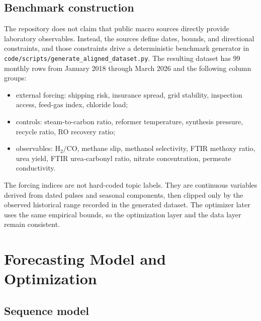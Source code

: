 \documentclass[11pt]{article}
\begin{document}
\subsection{Benchmark construction}

The repository does not claim that public macro sources directly provide laboratory observables. Instead, the sources define dates, bounds, and directional constraints, and those constraints drive a deterministic benchmark generator in \texttt{code/scripts/generate\_aligned\_dataset.py}. The resulting dataset has 99 monthly rows from January 2018 through March 2026 and the following column groups:

\begin{itemize}[leftmargin=1.5em]
\item external forcing: shipping risk, insurance spread, grid stability, inspection access, feed-gas index, chloride load;
\item controls: steam-to-carbon ratio, reformer temperature, synthesis pressure, recycle ratio, RO recovery ratio;
\item observables: \(\mathrm{H_2/CO}\), methane slip, methanol selectivity, FTIR methoxy ratio, urea yield, FTIR urea-carbonyl ratio, nitrate concentration, permeate conductivity.
\end{itemize}

The forcing indices are not hard-coded topic labels. They are continuous variables derived from dated pulses and seasonal components, then clipped only by the observed historical range recorded in the generated dataset. The optimizer later uses the same empirical bounds, so the optimization layer and the data layer remain consistent.

\section{Forecasting Model and Optimization}

\subsection{Sequence model}
\end{document}
